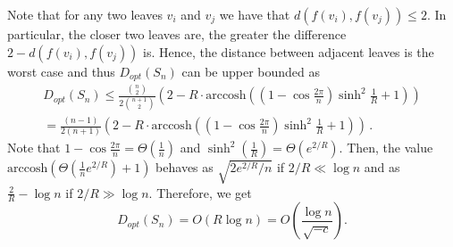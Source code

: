 \documentclass[runningheads]{llncs}
\begin{document}
Note that for any two leaves $v_i$ and $v_j$ we have that $d(f(v_i), f(v_j)) \le 2$. In particular, the closer two leaves are, the greater the difference $2 - d(f(v_i), f(v_j))$ is. Hence, the distance between adjacent leaves is the worst case and thus $D_{opt}(S_n)$ can be upper bounded as
\begin{multline*}
D_{opt}(S_n) \le \frac{{n \choose 2}}{2{n+1\choose 2}} \left(2 - R\cdot \mathrm{arccosh}\left( \left(1 - \cos \frac{2 \pi}{n}\right)\sinh^2\frac{1}{R}  + 1 \right)\right) \\
= \frac{(n-1)}{2(n+1)} \left(2 - R\cdot \mathrm{arccosh}\left( \left(1 - \cos \frac{2 \pi}{n}\right)\sinh^2\frac{1}{R}  + 1 \right)\right)\,.
\end{multline*}
Note that $1 - \cos\frac{2\pi}{n} = \Theta\left(\frac{1}{n}\right)$ and $\sinh^2\left(\frac{1}{R}\right) = \Theta\left(e^{2/R}\right)$.
Then, the value $\textrm{arccosh}\left(\Theta\left(\frac{1}{n} e^{2/R}\right) + 1 \right)$ behaves as $\sqrt{2e^{2/R}/n}$ if $2/R \ll \log n$ and as $\frac{2}{R} - \log n$ if $2/R \gg \log n$.
Therefore, we get
\[
D_{opt}(S_n) = O\left( R \log n \right) = O\left( \frac{\log n}{\sqrt{-c}} \right).
\]
\end{document}
